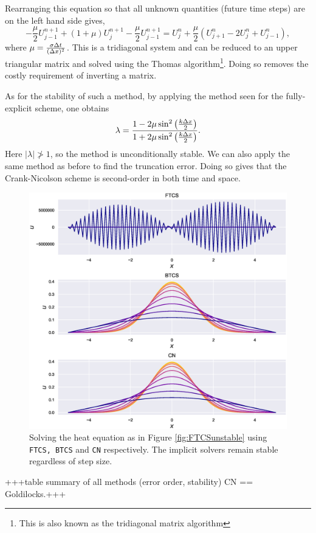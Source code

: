     Rearranging this equation so that all unknown quantities (future time steps) are on the left hand side gives,
    \[
    -\frac{\mu}{2} U^{n+1}_{j-1} + (1+\mu)U^{n+1}_{j} - \frac{\mu}{2} U^{n+1}_{j-1} = U^{n}_{j} + \frac{\mu}{2} \left( U^{n}_{j+1} - 2U^{n}_{j}+U^{n}_{j-1}\right),
    \]
    where $\mu = \frac{\sigma \Delta t}{(\Delta x)^2 }$. This is a tridiagonal system and can be reduced to an upper triangular matrix and solved using the Thomas algorithm\footnote{This is also known as the tridiagonal matrix algorithm}. Doing so removes the costly requirement of inverting a matrix.
    
    As for the stability of such a method, by applying the method seen for the fully-explicit scheme, one obtains 
    \[
    \lambda = \frac{1-2\mu\sin^2\left(\frac{k\Delta x}{2}\right)}{1+2\mu\sin^2\left(\frac{k\Delta x}{2}\right)}.
    \]
    Here $|\lambda| \not> 1$, so the method is unconditionally stable. We can also apply the same method as before to find the truncation error. Doing so gives that the Crank-Nicolson scheme is second-order in both time and space.
    \begin{figure}
        \centering
        \includegraphics[width=0.7\linewidth]{Figures/FTCSandCN}
        \caption{Solving the heat equation as in Figure \ref{fig:FTCSunstable} using \texttt{FTCS, BTCS} and \texttt{CN} respectively. The implicit solvers remain stable regardless of step size.}
        \label{fig:ftcsandcn}
    \end{figure}
    
    +++table summary of all methods (error order, stability) CN == Goldilocks.+++ 
